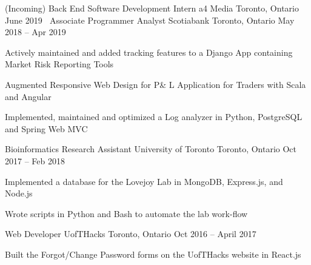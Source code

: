 \begin{cventries}
  \cventry
    {(Incoming) Back End Software Development Intern}
    {a4 Media}
    {Toronto, Ontario}
    {June 2019}
    {
      $\:$
    }
  \cventry
    {Associate Programmer Analyst}
    {Scotiabank}
    {Toronto, Ontario}
    {May 2018 -- Apr 2019}
    {
      \begin{cvitems}
        \item {Actively maintained and added tracking features to a Django App containing Market Risk Reporting Tools}
        \item {Augmented Responsive Web Design for P\& L Application for Traders with Scala and Angular}
        \item {Implemented, maintained and optimized a Log analyzer in Python, PostgreSQL and Spring Web MVC}
      \end{cvitems}
    }

  \cventry
    {Bioinformatics Research Assistant}
    {University of Toronto}
    {Toronto, Ontario}
    {Oct 2017 -- Feb 2018}
    {
      \begin{cvitems}
        \item {Implemented a database for the Lovejoy Lab in MongoDB, Express.js, and Node.js}
        \item {Wrote scripts in Python and Bash to automate the lab work-flow}
      \end{cvitems}
    }
  \cventry
    {Web Developer}
    {UofTHacks}
    {Toronto, Ontario}
    {Oct 2016 -- April 2017}
    {
      \begin{cvitems}
        \item {Built the Forgot/Change Password forms on the UofTHacks website in React.js}
      \end{cvitems}
    }
\end{cventries}
